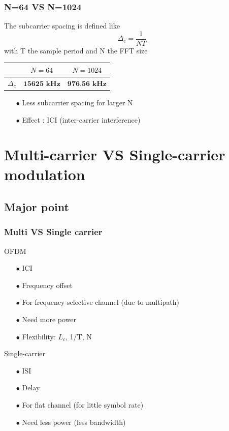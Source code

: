 \documentclass[11pt]{beamer}
\begin{document}
\begin{frame}
\frametitle{N=64 VS N=1024}
The subcarrier spacing is defined like
\begin{equation}
\Delta_c=\frac{1}{NT} 
\end{equation}
with T the sample period and N the FFT size

\begin{center}
	\begin{tabular}{c|c|c}
		  & $N=64$ & $N=1024$\\
		  \hline
	$\Delta_c$ & $\textbf{15625~kHz}$ & $\textbf{976.56 kHz}$ \\
	\end{tabular}
	\label{tab3}
\end{center}

\begin{itemize}

\item[$\bullet$] Less subcarrier spacing for larger N
\item[$\bullet$] Effect : ICI (inter-carrier interference)
\end{itemize}

\end{frame}

\section{Multi-carrier VS Single-carrier modulation}

\subsection{Major point}
\begin{frame}
\frametitle{Multi VS Single carrier}
\begin{minipage}[t]{0.48\linewidth}
OFDM
\begin{itemize}
\item[$\bullet$] {\color{red} ICI}
\item[$\bullet$] {\color{red} Frequency offset}
\item[$\bullet$] For frequency-selective channel (due to multipath)
\item[$\bullet$] Need more power
\item[$\bullet$] Flexibility: $L_c$, 1/T, N


\end{itemize}
\end{minipage}\hfill
\begin{minipage}[t]{0.48\linewidth}
Single-carrier
\begin{itemize}
\item[$\bullet$] {\color{red} ISI}
\item[$\bullet$] {\color{red} Delay} 
\item[$\bullet$] For flat channel (for little symbol rate)
\item[$\bullet$] Need less power (less bandwidth) 

\end{itemize}

\end{minipage}

\end{frame}
\end{document}
